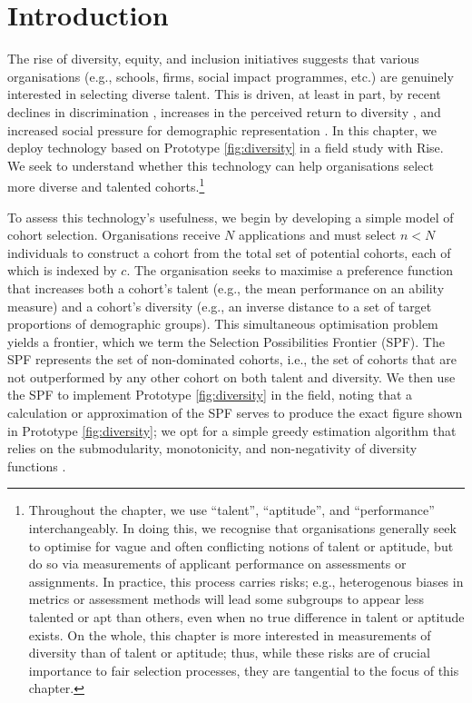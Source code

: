 \section{Introduction}\label{sec:spfintro}
The rise of diversity, equity, and inclusion initiatives suggests that various organisations (e.g., schools, firms, social impact programmes, etc.) are genuinely interested in selecting diverse talent. This is driven, at least in part, by recent declines in discrimination \cite{hsieh2019allocation}, increases in the perceived return to diversity \cite{deming2017growing, page_diversity_2017, noray2023systemic}, and increased social pressure for demographic representation \cite{minkin2023diversity}. In this chapter, we deploy technology based on Prototype \ref{fig:diversity} in a field study with Rise. We seek to understand whether this technology can help organisations select more diverse and talented cohorts.\footnote{Throughout the chapter, we use ``talent'', ``aptitude'', and ``performance'' interchangeably. In doing this, we recognise that organisations generally seek to optimise for vague and often conflicting notions of talent or aptitude, but do so via measurements of applicant performance on assessments or assignments. In practice, this process carries risks; e.g., heterogenous biases in metrics or assessment methods will lead some subgroups to appear less talented or apt than others, even when no true difference in talent or aptitude exists. On the whole, this chapter is more interested in measurements of diversity than of talent or aptitude; thus, while these risks are of crucial importance to fair selection processes, they are tangential to the focus of this chapter.}

To assess this technology's usefulness, we begin by developing a simple model of cohort selection. Organisations receive $N$ applications and must select $n<N$ individuals to construct a cohort from the total set of potential cohorts, each of which is indexed by $c$. The organisation seeks to maximise a preference function that increases both a cohort's talent (e.g., the mean performance on an ability measure) and a cohort's diversity (e.g., an inverse distance to a set of target proportions of demographic groups). This simultaneous optimisation problem yields a frontier, which we term the Selection Possibilities Frontier (SPF). The SPF represents the set of non-dominated cohorts, i.e., the set of cohorts that are not outperformed by any other cohort on both talent and diversity. We then use the SPF to implement Prototype \ref{fig:diversity} in the field, noting that a calculation or approximation of the SPF serves to produce the exact figure shown in Prototype \ref{fig:diversity}; we opt for a simple greedy estimation algorithm that relies on the submodularity, monotonicity, and non-negativity of diversity functions \cite{krause2014submodular, huppenkothen2020entrofy}.

